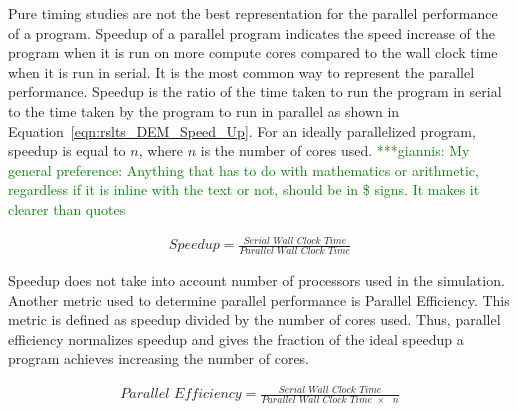 \documentclass[preprint,11pt,authoryear]{elsarticle}
\newcommand{\gpnote}[1]{{\textcolor{green} {***giannis: #1}}}
\newcommand{\gpnote}[1]{}
\begin{document}
Pure timing studies are not the best representation for the parallel performance of a program. 
Speedup of a parallel program indicates the speed increase of the program when it is run on more 
compute cores compared to the wall clock time when it is run in serial. It is the most common way to 
represent the parallel performance. Speedup is the ratio of the time taken to run the program in serial 
to the time taken by the program to run in parallel as shown in Equation~\ref{eqn:rslts_DEM_Speed_Up}. 
For an ideally parallelized program, speedup is equal to $n$, where $n$ is the number of cores used.
\gpnote{My general preference: Anything that has to do with mathematics or arithmetic, regardless if it
    is inline with the text or not, should be in \$ signs. It makes it clearer than quotes}

\begin{align}
\textit{Speedup} = \frac{\textit{Serial Wall Clock Time}}{\textit{Parallel Wall Clock Time}}\label{eqn:rslts_DEM_Speed_Up}
\end{align}

Speedup does not take into account number of processors used in the simulation. Another metric 
used to determine parallel performance is Parallel Efficiency. This metric is defined as 
speedup divided by the number of cores used. Thus, parallel efficiency normalizes speedup and gives 
the fraction of the ideal speedup a program achieves increasing the number of cores.

\begin{align}
\textit{Parallel Efficiency} = \frac{\textit{Serial Wall Clock Time}}{\textit{Parallel Wall Clock Time $\times$ $n$}}
\label{eqn:rslts_DEM_parallel_efficiency}
\end{align}
\end{document}
